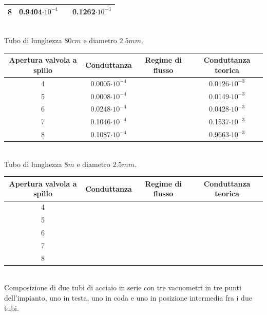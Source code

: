 \documentclass[a4paper,11pt]{article}
\begin{document}
\begin{center}
\begin{tabular}{|c|c|c|c|}
\hline 8 & 0.9404$\cdot10^{-4}$ &  & 0.1262$\cdot10^{-3}$ \\ 
\hline 
\end{tabular}\\
\vspace{5pt}
Tubo di lunghezza $80cm$ e diametro $2.5mm$.
\\
\vspace{15pt}
\begin{tabular}{|c|c|c|c|}
\hline Apertura valvola a spillo & Conduttanza & Regime di flusso & Conduttanza teorica \\ 
\hline 4 & 0.0005$\cdot10^{-4}$ &  & 0.0126$\cdot10^{-3}$ \\ 
\hline 5 & 0.0008$\cdot10^{-4}$ &  & 0.0149$\cdot10^{-3}$ \\ 
\hline 6 & 0.0248$\cdot10^{-4}$ &  & 0.0428$\cdot10^{-3}$ \\
\hline 7 & 0.1046$\cdot10^{-4}$ &  & 0.1537$\cdot10^{-3}$ \\
\hline 8 & 0.1087$\cdot10^{-4}$ &  & 0.9663$\cdot10^{-3}$ \\ 
\hline 
\end{tabular}\\
\vspace{5pt}
Tubo di lunghezza $8m$ e diametro $2.5mm$.
\\
\vspace{15pt}
\begin{tabular}{|c|c|c|c|}
\hline Apertura valvola a spillo & Conduttanza & Regime di flusso & Conduttanza teorica \\ 
\hline 4 &  &  &  \\ 
\hline 5 &  &  &  \\ 
\hline 6 &  &  &  \\
\hline 7 &  &  &  \\
\hline 8 &  &  &  \\ 
\hline 
\end{tabular}\\
Composizione di due tubi di acciaio in serie con tre vacuometri in tre punti dell'impianto, uno in testa, uno in coda e uno in posizione intermedia fra i due tubi.
\vspace{10pt}
\end{center}
\end{document}
